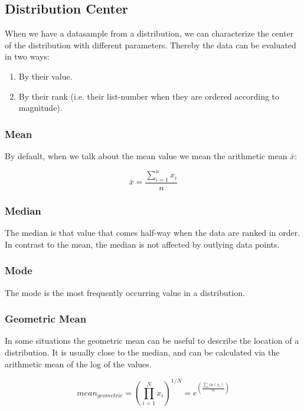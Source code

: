 \subsection{Distribution Center}

When we have a datasample from a distribution, we can characterize the center of the distribution with different parameters. Thereby the data can be evaluated in two ways:

\begin{enumerate}
  \item By their value.
  \item By their \gls{rank} (i.e. their list-number when they are ordered according to magnitude).
\end{enumerate}

\subsubsection{Mean} 
By default, when we talk about the mean value we mean the arithmetic mean $\bar{x}$:

\begin{equation}
  \bar{x} = \frac{{\sum\limits_{i = 1}^n {{x_i}} }}{n}
\end{equation}

\subsubsection{Median} 
The \gls{median} is that value that comes half-way when the data are ranked in order.
In contrast to the mean, the median is not affected by outlying data points.

\subsubsection{Mode} 
The \gls{mode} is the most frequently occurring value in a distribution.

\subsubsection{Geometric Mean}
In some situations the geometric mean can be useful to describe the location of a distribution. It is usually close to the median, and can be calculated via the arithmetic mean of the log of the values.

\begin{equation}\label{eq:geometricMean}
  mean_{geometric} =  \left(\prod_{i=1}^N x_i\right)^{1/N} = e^{\left( \frac{\sum_i ln(x_i)}{n} \right)}
\end{equation}

